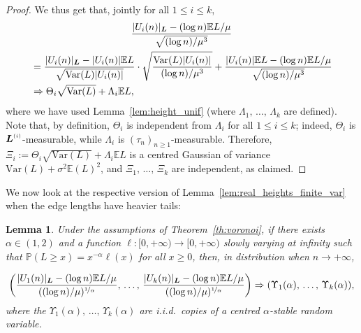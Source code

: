 \documentclass[10pt]{amsart}
\newtheorem{lemm}[theo]{Lemma}\newtheorem{prop}[theo]{Proposition}\newtheorem{coro}[theo]{Corollary}\newtheorem{conj}[theo]{Conjecture}
\theoremstyle{definition}\newtheorem{defi}[theo]{Definition}\newtheorem{rema}[theo]{Remark}\newtheorem{exam}[theo]{Example}\newtheorem{exem}[theo]{Example}\newtheorem{nota}[theo]{Notation}
\newcommand{\bs}{\ensuremath{\boldsymbol}}
\newcommand{\sss}{\ensuremath{\scriptscriptstyle}}
\newcommand{\bbP}{\mathbb{P}}
\newcommand{\bbE}{\mathbb{E}}
\newcommand{\Var}{\mathrm{Var}}
\begin{document}
\begin{proof}
We thus get that, jointly for all $1\leq i\leq k$,
\begin{multline*}
\frac{|U_i(n)|_{\bs L}-(\log n)\bbE L/\mu}{\sqrt{(\log n)/\mu^3}}\\
\begin{aligned}
&= \frac{|U_i(n)|_{\bs L}-|U_i(n)|\bbE L}{\sqrt{\Var(L)|U_i(n)|}}
\cdot \sqrt{\frac{\Var(L)|U_i(n)|}{(\log n)/\mu^3}} + \frac{|U_i(n)|\bbE L-(\log n)\bbE L/\mu}{\sqrt{(\log n)/\mu^3}}\\
&\Rightarrow \Theta_i\sqrt{\Var(L)}+\Lambda_i\bbE L,
\end{aligned}
\end{multline*}
where we have used Lemma~\ref{lem:height_unif} (where $\Lambda_1, \,\ldots,\,\Lambda_k$ are defined). Note that, by definition, $\Theta_i$ is independent from $\Lambda_i$ for all $1\leq i\leq k$; indeed, $\Theta_i$ is $\bs L^{\sss (i)}$-measurable, while $\Lambda_i$ is $(\tau_n)_{n\geq 1}$-measurable. Therefore, $\Xi_i:=\Theta_i\sqrt{\Var(L)}+\Lambda_i\bbE L$ is a centred Gaussian of variance $\Var(L) + \sigma^2\bbE(L)^2$, and $\Xi_1,\,\ldots,\, \Xi_k$ are independent, as claimed.
\end{proof}


We now look at the respective version of Lemma~\ref{lem:real_heights_finite_var} when the edge lengths have heavier tails:

\begin{lemm}\label{lem:real_height_heavy_tails}
Under the assumptions of Theorem~\ref{th:voronoi}, if there exists $\alpha\in (1,2)$ and a function $\ell\colon[0,+\infty)\to[0,+\infty)$ slowly varying at infinity such that $\bbP(L\geq x)=x^{-\alpha}\ell(x)$ for all $x\geq 0$, then, in distribution when $n\to+\infty$,

\[
\left(\frac{|U_1(n)|_{\bs L} - (\log n)\bbE L/\mu}{((\log n)/\mu)^{\nicefrac1\alpha}},\,\ldots,
\,\frac{|U_k(n)|_{\bs L} - (\log n)\bbE L/\mu}{((\log n)/\mu)^{\nicefrac1\alpha}}
\right)\Rightarrow (\Upsilon_1(\alpha),\,\ldots,\, \Upsilon_k(\alpha)),
\]
where the $\Upsilon_1(\alpha),\,\ldots,\, \Upsilon_k(\alpha)$ are i.i.d.\ copies of a centred $\alpha$-stable random variable.
\end{lemm}
\end{document}
